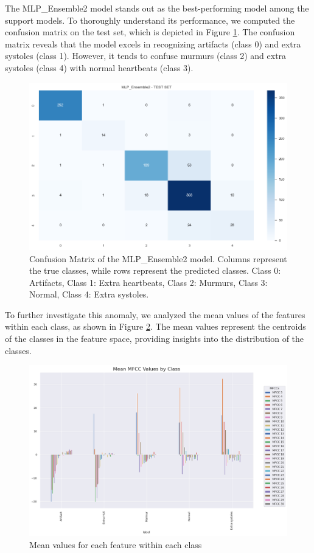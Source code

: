The MLP\_Ensemble2 model stands out as the best-performing model among the support models. 
To thoroughly understand its performance, we computed the confusion matrix on the test set, which is depicted in Figure \ref{fig:support_models_conf_matrix}. 
The confusion matrix reveals that the model excels in recognizing artifacts (class 0) and extra systoles (class 1).
 However, it tends to confuse murmurs (class 2) and extra systoles (class 4) with normal heartbeats (class 3).
\begin{figure}[H]
    \centering
    \includegraphics[width=0.8\columnwidth]{../images/support_models_conf_matrix.png}
    \caption{Confusion Matrix of the MLP\_Ensemble2 model. Columns represent the true classes, while rows represent the predicted classes. Class 0: Artifacts, Class 1: Extra heartbeats, Class 2: Murmurs, Class 3: Normal, Class 4: Extra systoles.}
    \label{fig:support_models_conf_matrix}
\end{figure}
\noindent
To further investigate this anomaly, we analyzed the mean values of the features within each class, as shown in Figure \ref{fig:mean_val_for_features}. 
The mean values represent the centroids of the classes in the feature space, providing insights into the distribution of the classes.
\begin{figure}[H]
    \centering
    \includegraphics[width=\columnwidth]{../images/mean_val_for_features.png}
    \caption{Mean values for each feature within each class}
    \label{fig:mean_val_for_features}
\end{figure}
